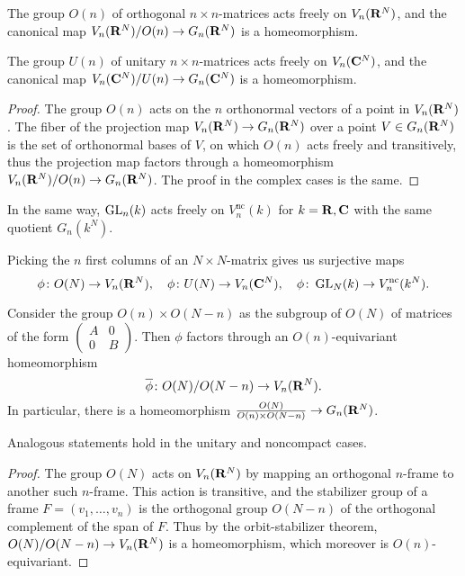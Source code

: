 \documentclass[a4paper,openany]{scrbook}
\begin{document}
\begin{lemma} \label{lemma:principalfibrationongrassmannian}
The group $O(n)$ of orthogonal $n\times n$-matrices acts freely on $V_n(\mathbf R^N)$, and the canonical map $V_n(\mathbf R^N)/O(n) \to G_n(\mathbf R^N)$ is a homeomorphism. 

The group $U(n)$ of unitary $n\times n$-matrices acts freely on $V_n(\mathbf C^N)$, and the canonical map $V_n(\mathbf C^N)/U(n) \to G_n(\mathbf C^N)$ is a homeomorphism.
\end{lemma}
\begin{proof}
The group $O(n)$ acts on the $n$ orthonormal vectors of a point in $V_n(\mathbf R^N)$. The fiber of the projection map $V_n(\mathbf R^N) \to G_n(\mathbf R^N)$ over a point $V \in G_n(\mathbf R^N)$ is the set of orthonormal bases of $V$, on which $O(n)$ acts freely and transitively, thus the projection map factors through a homeomorphism $V_n(\mathbf R^N)/O(n) \to G_n(\mathbf R^N)$. The proof in the complex cases is the same.
\end{proof}

\begin{remark}
In the same way, $\operatorname{GL}_n(k)$ acts freely on $V_n^{\operatorname{nc}}(k)$ for $k=\mathbf R,\mathbf C$ with the same quotient $G_n(k^N)$.
\end{remark}

Picking the $n$ first columns of an $N\times N$-matrix gives us surjective maps
\[
\phi\colon O(N) \to V_n(\mathbf R^N), \quad \phi\colon U(N) \to V_n(\mathbf C^N), \quad \phi\colon \operatorname{GL}_N(k) \to V_n^{\operatorname{nc}}(k^N).
\]

\begin{lemma}\label{lemma:grassstiefelashomogeneousspaces}
Consider the group $O(n) \times O(N-n)$ as the subgroup of $O(N)$ of matrices of the form $\left(\begin{smallmatrix} A & 0\\ 0 & B\end{smallmatrix}\right)$. Then $\phi$ factors through an $O(n)$-equivariant homeomorphism
\[
\overline\phi\colon O(N)/O(N-n) \to V_n(\mathbf R^N).
\]
In particular, there is a homeomorphism $\frac{O(N)}{O(n)\times O(N-n)} \to G_n(\mathbf R^N)$.

Analogous statements hold in the unitary and noncompact cases.
\end{lemma}
\begin{proof}
The group $O(N)$ acts on $V_n(\mathbf R^N)$ by mapping an orthogonal $n$-frame to another such $n$-frame. This action is transitive, and the stabilizer group of a frame $F=(v_1,\dots,v_n)$ is the orthogonal group $O(N-n)$ of the orthogonal complement of the span of $F$. Thus by the orbit-stabilizer theorem, $O(N)/O(N-n) \to V_n(\mathbf R^N)$ is a homeomorphism, which moreover is $O(n)$-equivariant.
\end{proof}
\end{document}
